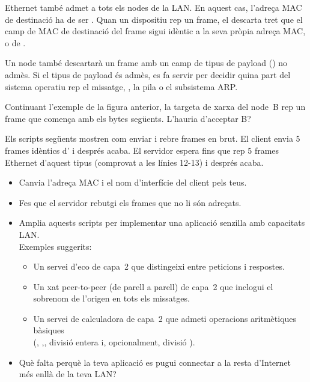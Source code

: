 Ethernet també admet  a tots els nodes de la LAN. En aquest cas, l'adreça MAC
de destinació ha de ser .
% 
Quan un dispositiu rep un frame, el descarta tret que el camp de MAC de destinació del frame
sigui idèntic a la seva pròpia adreça MAC, o de . 

Un node també descartarà un frame amb un camp de tipus de payload () no admès. 
% 
Si el tipus de payload és admès, es fa servir per decidir quina part del sistema operatiu rep el missatge,
\eg, la pila  o el subsistema ARP.

\begin{exercise} Continuant l'exemple de la figura anterior, la targeta de xarxa del node~B rep
un frame que comença amb els bytes següents. L'hauria d'acceptar B?
\begin{center}
\end{center}
\end{exercise}

\begin{exercise}
Els scripts següents mostren com enviar i rebre frames  en brut. 
El client envia $5$ frames idèntics d'  i després acaba.
El servidor espera fins que rep $5$ frames Ethernet d'aquest tipus (comprovat a les línies 12-13) i després acaba.
% 
\begin{itemize}
\item Canvia l'adreça MAC i el nom d'interfície del client pels teus.
\item Fes que el servidor rebutgi els frames que no li són adreçats.
\item Amplia aquests scripts per implementar una aplicació senzilla amb capacitats LAN.\\
  Exemples suggerits:
    \begin{itemize}
    \item Un servei d'eco de capa~2 que distingeixi entre peticions i respostes.
    \item Un xat peer-to-peer (de parell a parell) de capa~2 que inclogui el sobrenom de l'origen en tots els missatges.
    \item Un servei de calculadora de capa~2 que admeti operacions aritmètiques bàsiques\\
      (\inlineCode{+}, \inlineCode{-},\inlineCode{*}, divisió entera \inlineCode{//} i, opcionalment, divisió \inlineCode{/}).
    \end{itemize}
\item Què falta perquè la teva aplicació es pugui connectar a la resta d'Internet més enllà de la teva LAN?
\end{itemize}

\label{ex:layer2:echo}
\end{exercise}

